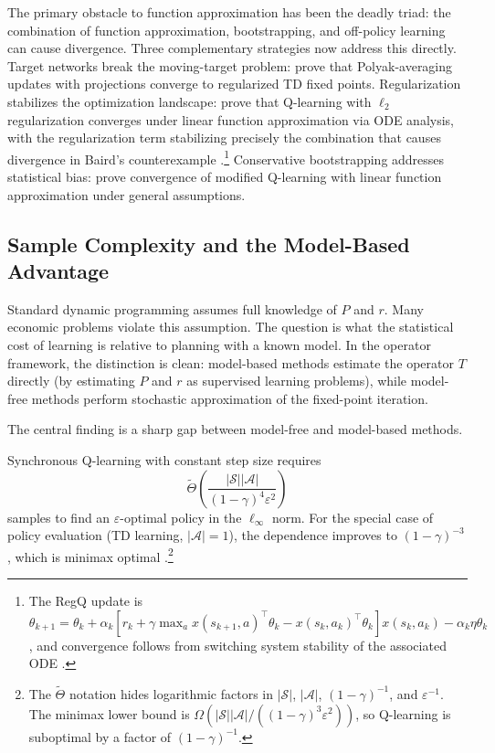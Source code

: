 The primary obstacle to function approximation has been the deadly triad: the combination of function approximation, bootstrapping, and off-policy learning can cause divergence. Three complementary strategies now address this directly. Target networks break the moving-target problem: \citet{zhang2021target} prove that Polyak-averaging updates with projections converge to regularized TD fixed points. Regularization stabilizes the optimization landscape: \citet{lim2024regularized} prove that Q-learning with $\ell_2$ regularization converges under linear function approximation via ODE analysis, with the regularization term stabilizing precisely the combination that causes divergence in Baird's counterexample \citep{Baird1995}.\footnote{The RegQ update is $\theta_{k+1} = \theta_k + \alpha_k [r_k + \gamma \max_a x(s_{k+1}, a)^\top \theta_k - x(s_k, a_k)^\top \theta_k] x(s_k, a_k) - \alpha_k \eta \theta_k$, and convergence follows from switching system stability of the associated ODE \citep{lim2024regularized}.} Conservative bootstrapping addresses statistical bias: \citet{carvalho2020convergence} prove convergence of modified Q-learning with linear function approximation under general assumptions.


\subsection{Sample Complexity and the Model-Based Advantage}
\label{sec:sample_complexity}

Standard dynamic programming assumes full knowledge of $P$ and $r$. Many economic problems violate this assumption. The question is what the statistical cost of learning is relative to planning with a known model. In the operator framework, the distinction is clean: model-based methods estimate the operator $T$ directly (by estimating $P$ and $r$ as supervised learning problems), while model-free methods perform stochastic approximation of the fixed-point iteration.

The central finding is a sharp gap between model-free and model-based methods.

\begin{theorem}
\label{thm:q_learning_sample}
Synchronous Q-learning with constant step size requires
\[
\tilde{\Theta}\!\left(\frac{|\mathcal{S}||\mathcal{A}|}{(1-\gamma)^4 \varepsilon^2}\right)
\]
samples to find an $\varepsilon$-optimal policy in the $\ell_\infty$ norm. For the special case of policy evaluation (TD learning, $|\mathcal{A}|=1$), the dependence improves to $(1-\gamma)^{-3}$, which is minimax optimal \citep{li2024minimax}.\footnote{The $\tilde{\Theta}$ notation hides logarithmic factors in $|\mathcal{S}|$, $|\mathcal{A}|$, $(1-\gamma)^{-1}$, and $\varepsilon^{-1}$. The minimax lower bound is $\Omega(|\mathcal{S}||\mathcal{A}|/((1-\gamma)^3\varepsilon^2))$, so Q-learning is suboptimal by a factor of $(1-\gamma)^{-1}$.}
\end{theorem}

